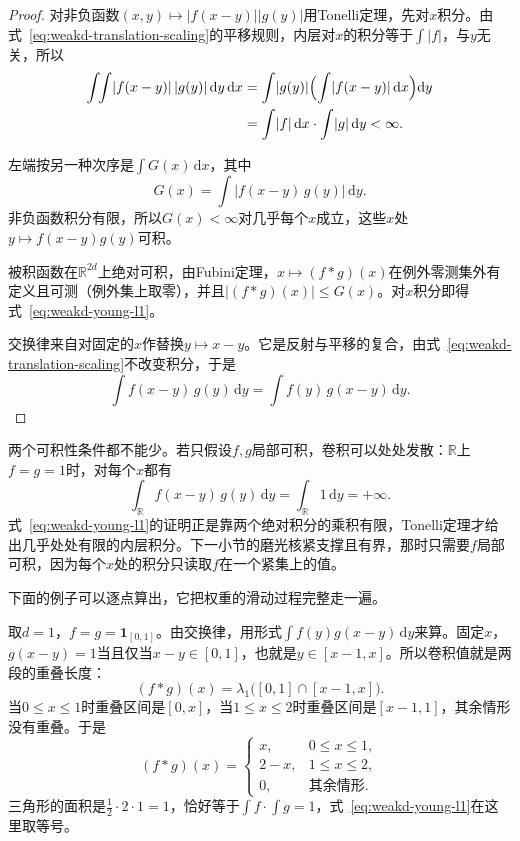 \begin{proof}
对非负函数$(x,y)\mapsto\lvert f(x-y)\rvert\lvert g(y)\rvert$用Tonelli定理，先对$x$积分。由式~\eqref{eq:weakd-translation-scaling}的平移规则，内层对$x$的积分等于$\int\lvert f\rvert$，与$y$无关，所以
\[
\begin{aligned}
\int\!\!\int\lvert f(x-y)\rvert\,\lvert g(y)\rvert\,\mathrm dy\,\mathrm dx
&=\int\lvert g(y)\rvert\Bigl(\int\lvert f(x-y)\rvert\,\mathrm dx\Bigr)\mathrm dy\\
&=\int\lvert f\rvert\,\mathrm dx\cdot\int\lvert g\rvert\,\mathrm dy<\infty .
\end{aligned}
\]

左端按另一种次序是$\int G(x)\,\mathrm dx$，其中
\[
G(x)=\int\lvert f(x-y)\,g(y)\rvert\,\mathrm dy .
\]
非负函数积分有限，所以$G(x)<\infty$对几乎每个$x$成立，这些$x$处$y\mapsto f(x-y)g(y)$可积。

被积函数在$\mathbb R^{2d}$上绝对可积，由Fubini定理，$x\mapsto(f*g)(x)$在例外零测集外有定义且可测（例外集上取零），并且$\lvert(f*g)(x)\rvert\leq G(x)$。对$x$积分即得式~\eqref{eq:weakd-young-l1}。

交换律来自对固定的$x$作替换$y\mapsto x-y$。它是反射与平移的复合，由式~\eqref{eq:weakd-translation-scaling}不改变积分，于是
\[
\int f(x-y)\,g(y)\,\mathrm dy=\int f(y)\,g(x-y)\,\mathrm dy .
\]
\end{proof}

两个可积性条件都不能少。若只假设$f,g$局部可积，卷积可以处处发散：$\mathbb R$上$f=g=1$时，对每个$x$都有
\[
\int_{\mathbb R}f(x-y)\,g(y)\,\mathrm dy=\int_{\mathbb R}1\,\mathrm dy=+\infty .
\]
式~\eqref{eq:weakd-young-l1}的证明正是靠两个绝对积分的乘积有限，Tonelli定理才给出几乎处处有限的内层积分。下一小节的磨光核紧支撑且有界，那时只需要$f$局部可积，因为每个$x$处的积分只读取$f$在一个紧集上的值。

下面的例子可以逐点算出，它把权重的滑动过程完整走一遍。

\begin{example}[两个盒函数的卷积]
\label{ex:weakd-box-convolution}
取$d=1$，$f=g=\mathbf 1_{[0,1]}$。由交换律，用形式$\int f(y)g(x-y)\,\mathrm dy$来算。固定$x$，$g(x-y)=1$当且仅当$x-y\in[0,1]$，也就是$y\in[x-1,x]$。所以卷积值就是两段的重叠长度：
\[
(f*g)(x)=\lambda_1\bigl([0,1]\cap[x-1,x]\bigr).
\]
当$0\leq x\leq1$时重叠区间是$[0,x]$，当$1\leq x\leq2$时重叠区间是$[x-1,1]$，其余情形没有重叠。于是
\[
(f*g)(x)=\begin{cases}x,&0\leq x\leq1,\\2-x,&1\leq x\leq2,\\0,&\text{其余情形}.\end{cases}
\]
三角形的面积是$\frac12\cdot2\cdot1=1$，恰好等于$\int f\cdot\int g=1$，式~\eqref{eq:weakd-young-l1}在这里取等号。
\end{example}

